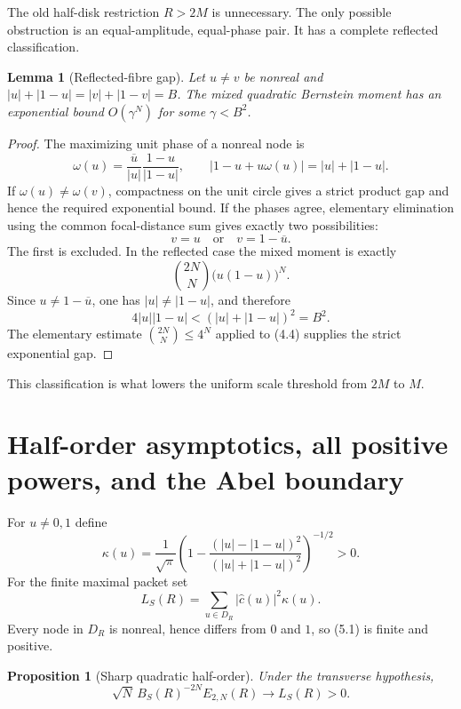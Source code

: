 \documentclass[11pt]{article}
\newtheorem{proposition}[theorem]{Proposition}
\newtheorem{lemma}[theorem]{Lemma}
\theoremstyle{remark}
\begin{document}
The old half-disk restriction $R>2M$ is unnecessary.  The only possible obstruction is an
equal-amplitude, equal-phase pair.  It has a complete reflected classification.

\begin{lemma}[Reflected-fibre gap]
\label{lem:reflected}
Let $u\ne v$ be nonreal and
$|u|+|1-u|=|v|+|1-v|=B$.  The mixed quadratic Bernstein moment has an exponential bound
$O(\gamma^N)$ for some $\gamma<B^2$.
\end{lemma}

\begin{proof}
The maximizing unit phase of a nonreal node is
\[
 \omega(u)=\frac{\overline u}{|u|}\frac{1-u}{|1-u|},
 \qquad |1-u+u\omega(u)|=|u|+|1-u|.
\]
If $\omega(u)\ne\omega(v)$, compactness on the unit circle gives a strict product gap and hence
the required exponential bound.  If the phases agree, elementary elimination using the common
focal-distance sum gives exactly two possibilities:
\[
 v=u\quad\text{or}\quad v=1-\overline u.
\]
The first is excluded.  In the reflected case the mixed moment is exactly
\begin{equation}
 \binom{2N}{N}\bigl(u(1-u)\bigr)^N.
 \tag{4.4}
\end{equation}
Since $u\ne1-\overline u$, one has $|u|\ne|1-u|$, and therefore
\[
 4|u||1-u|<( |u|+|1-u|)^2=B^2.
\]
The elementary estimate $\binom{2N}{N}\le4^N$ applied to (4.4) supplies the strict exponential
gap.
\end{proof}

This classification is what lowers the uniform scale threshold from $2M$ to $M$.

\section{Half-order asymptotics, all positive powers, and the Abel boundary}
\label{sec:abel}

For $u\ne0,1$ define
\begin{equation}
 \kappa(u)=\frac1{\sqrt\pi}
 \left(1-\frac{(|u|-|1-u|)^2}{(|u|+|1-u|)^2}\right)^{-1/2}>0.
 \tag{5.1}
\end{equation}
For the finite maximal packet set
\begin{equation}
 L_S(R)=\sum_{u\in D_R}|\widehat c(u)|^2\kappa(u).
 \tag{5.2}
\end{equation}
Every node in $D_R$ is nonreal, hence differs from $0$ and $1$, so (5.1) is finite and positive.

\begin{proposition}[Sharp quadratic half-order]
\label{prop:halforder}
Under the transverse hypothesis,
\[
 \sqrt N\,B_S(R)^{-2N}E_{2,N}(R)\longrightarrow L_S(R)>0.
\]
\end{proposition}
\end{document}
